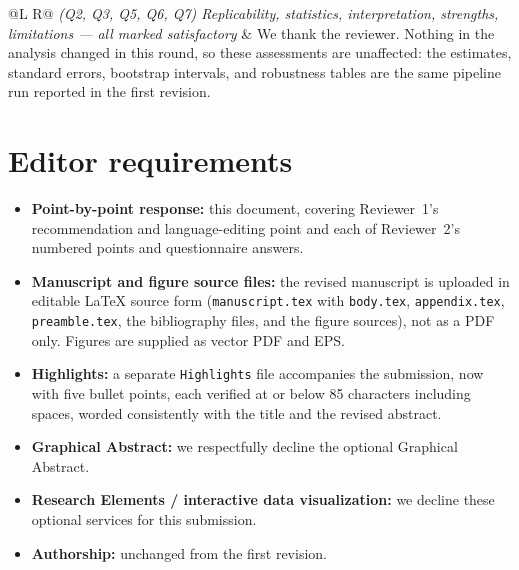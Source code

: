 \documentclass[11pt]{article}
\begin{document}
\begin{longtable}{@{}L R@{}}
\textit{(Q2, Q3, Q5, Q6, Q7) Replicability, statistics, interpretation, strengths, limitations --- all marked satisfactory} &
We thank the reviewer. Nothing in the analysis changed in this round, so these assessments are unaffected: the estimates, standard errors, bootstrap intervals, and robustness tables are the same pipeline run reported in the first revision.\\
\midrule

\end{longtable}

\section*{Editor requirements}

\begin{itemize}
\item \textbf{Point-by-point response:} this document, covering Reviewer~1's recommendation and language-editing point and each of Reviewer~2's numbered points and questionnaire answers.
\item \textbf{Manuscript and figure source files:} the revised manuscript is uploaded in editable \LaTeX{} source form (\texttt{manuscript.tex} with \texttt{body.tex}, \texttt{appendix.tex}, \texttt{preamble.tex}, the bibliography files, and the figure sources), not as a PDF only. Figures are supplied as vector PDF and EPS.
\item \textbf{Highlights:} a separate \texttt{Highlights} file accompanies the submission, now with five bullet points, each verified at or below 85 characters including spaces, worded consistently with the title and the revised abstract.
\item \textbf{Graphical Abstract:} we respectfully decline the optional Graphical Abstract.
\item \textbf{Research Elements / interactive data visualization:} we decline these optional services for this submission.
\item \textbf{Authorship:} unchanged from the first revision.
\end{itemize}
\end{document}
